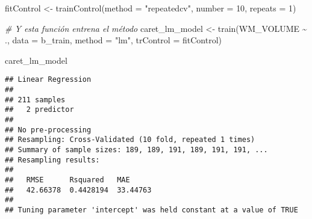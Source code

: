 \documentclass[
]{article}
\newenvironment{Shaded}{\begin{snugshade}}{\end{snugshade}}
\newcommand{\AttributeTok}[1]{\textcolor[rgb]{0.77,0.63,0.00}{#1}}
\newcommand{\CommentTok}[1]{\textcolor[rgb]{0.56,0.35,0.01}{\textit{#1}}}
\newcommand{\ConstantTok}[1]{\textcolor[rgb]{0.00,0.00,0.00}{#1}}
\newcommand{\DecValTok}[1]{\textcolor[rgb]{0.00,0.00,0.81}{#1}}
\newcommand{\FunctionTok}[1]{\textcolor[rgb]{0.00,0.00,0.00}{#1}}
\newcommand{\NormalTok}[1]{#1}
\newcommand{\OtherTok}[1]{\textcolor[rgb]{0.56,0.35,0.01}{#1}}
\newcommand{\SpecialCharTok}[1]{\textcolor[rgb]{0.00,0.00,0.00}{#1}}
\newcommand{\StringTok}[1]{\textcolor[rgb]{0.31,0.60,0.02}{#1}}
\begin{document}
\begin{Shaded}
\end{Shaded}

\begin{Shaded}
\begin{Highlighting}[]
\NormalTok{fitControl }\OtherTok{\textless{}{-}} \FunctionTok{trainControl}\NormalTok{(}\AttributeTok{method =} \StringTok{"repeatedcv"}\NormalTok{,}
                           \AttributeTok{number =} \DecValTok{10}\NormalTok{,}
                           \AttributeTok{repeats =} \DecValTok{1}\NormalTok{)}

\CommentTok{\# Y esta función entrena el método}
\NormalTok{caret\_lm\_model }\OtherTok{\textless{}{-}} \FunctionTok{train}\NormalTok{(WM\_VOLUME }\SpecialCharTok{\textasciitilde{}}\NormalTok{ ., }
                        \AttributeTok{data =}\NormalTok{ b\_train, }
                        \AttributeTok{method =} \StringTok{"lm"}\NormalTok{,}
                        \AttributeTok{trControl =}\NormalTok{ fitControl)}
\end{Highlighting}
\end{Shaded}

\begin{Shaded}
\begin{Highlighting}[]
\NormalTok{caret\_lm\_model}
\end{Highlighting}
\end{Shaded}

\begin{verbatim}
## Linear Regression 
## 
## 211 samples
##   2 predictor
## 
## No pre-processing
## Resampling: Cross-Validated (10 fold, repeated 1 times) 
## Summary of sample sizes: 189, 189, 191, 189, 191, 191, ... 
## Resampling results:
## 
##   RMSE      Rsquared   MAE     
##   42.66378  0.4428194  33.44763
## 
## Tuning parameter 'intercept' was held constant at a value of TRUE
\end{verbatim}
\end{document}
